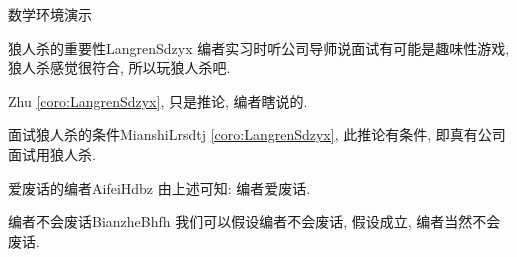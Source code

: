 \documentclass[hyperref,UTF8,11pt,CJK]{beamer}
\begin{document}
\begin{frame}{数学环境演示}
\begin{scucorollary}{狼人杀的重要性}{LangrenSdzyx}
		编者实习时听公司导师说面试有可能是趣味性游戏, 狼人杀感觉很符合, 所以玩狼人杀吧.
	\end{scucorollary}
	\begin{scuremark}{}{Zhu}
		\vref{coro:LangrenSdzyx}, 只是推论, 编者瞎说的.
	\end{scuremark}
	\begin{scucondition}{面试狼人杀的条件}{MianshiLrsdtj}
		\vref{coro:LangrenSdzyx}, 此推论有条件, 即真有公司面试用狼人杀.
	\end{scucondition}
	\begin{scuconclusion}{爱废话的编者}{AifeiHdbz}
		由上述可知: 编者爱废话.
	\end{scuconclusion}
	\begin{scuassumption}{编者不会废话}{BianzheBhfh}
		我们可以假设编者不会废话, 假设成立, 编者当然不会废话.
	\end{scuassumption}
\end{frame}
\end{document}
